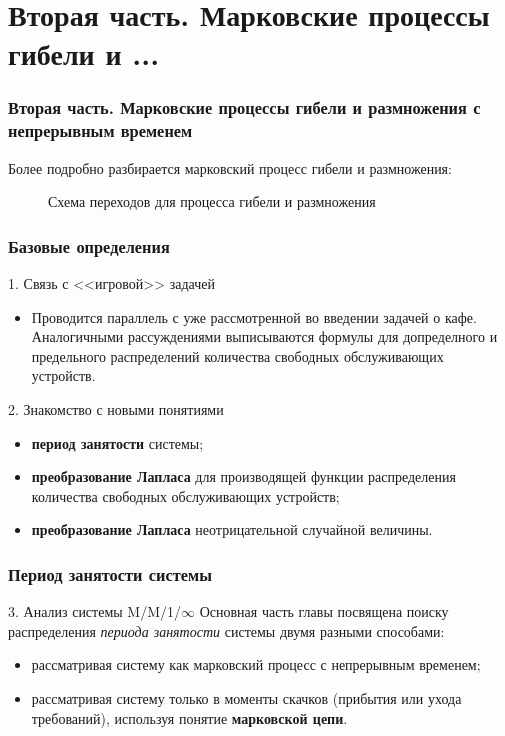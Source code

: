 \documentclass[10pt]{beamer}
\begin{document}
\section{Вторая часть. Марковские процессы гибели и ...}
\begin{frame}[fragile]
\frametitle{Вторая часть. Марковские процессы гибели и размножения с непрерывным временем}
Более подробно разбирается марковский процесс гибели и размножения:
\begin{figure}[h]
    \centering
    \caption{Схема переходов для процесса гибели и размножения}
    \label{VK:fig:2}
  \end{figure}
\end{frame}


\begin{frame}[fragile]
\frametitle{Базовые определения}
\begin{block}{1. Связь с <<игровой>> задачей}
\begin{itemize}
    \item 
Проводится параллель с уже рассмотренной во введении задачей о кафе. Аналогичными рассуждениями выписываются формулы для допределного и предельного распределений количества свободных обслуживающих устройств.
\end{itemize}
\end{block}

\medskip
\medskip

\begin{block}{2. Знакомство с новыми понятиями}
\begin{itemize}
    \item \textbf{период занятости} системы;
    \item \textbf{преобразование Лапласа} для производящей функции распределения количества свободных обслуживающих устройств;
    \item \textbf{преобразование Лапласа} неотрицательной случайной величины.
\end{itemize}
\end{block}
\end{frame}

\begin{frame}[fragile]
\frametitle{Период занятости системы}
\begin{block}{3. Анализ системы M/M/1/$\infty$}
Основная часть главы посвящена поиску распределения \textit{периода занятости} системы двумя разными способами:
\begin{itemize}
    \item рассматривая систему как марковский процесс с непрерывным временем;
    \item рассматривая систему только в моменты скачков (прибытия или ухода требований), используя понятие \textbf{марковской цепи}.
\end{itemize}
\end{block}
\end{frame}
\end{document}
